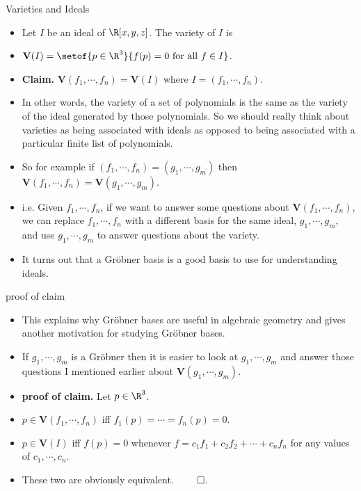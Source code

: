 \documentclass{beamer}
\begin{document}

\begin{frame}{Varieties and Ideals}

\begin{itemize}
  \item Let $I$ be an ideal of $\R[x,y,z]$. The variety of $I$ is
  \item $\mathbf{V}(I) = \setof{p\in\R^3}{f(p)=0\text{ for all } f\in I}$.
  \item \textbf{Claim.} $\mathbf{V}(f_1,\cdots,f_n) = \mathbf{V}(I)$ where $I = (f_1,\cdots,f_n)$.
  \item In other words, the variety of a set of polynomials is the same as the variety of the ideal generated by those polynomials.
  So we should really think about varieties as being associated with ideals as opposed to being associated with a particular finite list of polynomials.
  \item So for example if $(f_1,\cdots,f_n) = (g_1,\cdots,g_m)$ then $\mathbf{V}(f_1,\cdots,f_n) = \mathbf{V}(g_1,\cdots,g_m)$.
  \item i.e. Given $f_1,\cdots,f_n$, if we want to answer some questions about $\mathbf{V}(f_1,\cdots,f_n)$,
  we can replace $f_1,\cdots,f_n$ with a different basis for the same ideal, $g_1,\cdots,g_m$, and use
  $g_1,\cdots,g_m$ to answer questions about the variety.
  \item It turns out that a Gr\"{o}bner basis is a good basis to use for understanding ideals.
\end{itemize}
\end{frame}



\begin{frame}{proof of claim}

\begin{itemize}
  \item This explains why Gr\"{o}bner bases are useful in algebraic geometry and gives another motivation for studying Gr\"{o}bner bases.
  \item If $g_1,\cdots,g_m$ is a Gr\"{o}bner then it is easier to look at $g_1,\cdots,g_m$ and answer those questions I mentioned earlier
  about $\mathbf{V}(g_1,\cdots,g_m)$.
  \item \textbf{proof of claim.} Let $p\in\R^3$.
  \item $p\in \textbf{V}(f_1,\cdots,f_n)$ iff $f_1(p) = \cdots = f_n(p) = 0$.
  \item $p\in \textbf{V}(I)$ iff $f(p)=0$ whenever $f=c_1f_1 + c_2f_2 + \cdots + c_nf_n$ for any values of $c_1,\cdots,c_n$.
  \item These two are obviously equivalent. $\qed$.
\end{itemize}
\end{frame}
\end{document}
